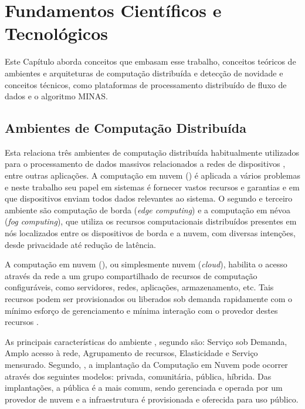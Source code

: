 
\chapter{Fundamentos Científicos e Tecnológicos}\label{cha:fundamentos}

Este Capítulo aborda conceitos que embasam esse trabalho,
conceitos teóricos de
ambientes e arquiteturas de computação distribuída e detecção de novidade
e conceitos técnicos, como plataformas de processamento distribuído de fluxo
de dados e o algoritmo MINAS.

\section{Ambientes de Computação Distribuída}

Esta \Section relaciona três ambientes de computação distribuída habitualmente
utilizados para o processamento de dados massivos relacionados a redes de
dispositivos \iot, entre outras aplicações.
A computação em nuvem (\cloud) é
aplicada a vários problemas e neste trabalho seu papel em sistemas \iot é
fornecer vastos recursos e garantias e em que dispositivos
enviam todos dados relevantes ao sistema.
O segundo e terceiro ambiente são computação de borda (\emph{edge computing})
e a computação em névoa (\emph{fog computing}), que utiliza os recursos
computacionais distribuídos presentes em nós localizados entre os dispositivos
de borda e a nuvem, com diversas 
intenções, desde privacidade até redução de latência.


A computação em nuvem (\cloud), ou simplesmente nuvem
(\emph{cloud}), habilita o acesso através da rede a um grupo compartilhado de
recursos de computação configuráveis, como servidores, redes, aplicações,
armazenamento, etc.
Tais recursos podem ser provisionados ou liberados sob
demanda rapidamente com o mínimo esforço de gerenciamento
e mínima interação com o provedor destes recursos \cite{NIST2011}.

As principais características do ambiente \cloud, segundo 
são: Serviço sob Demanda, Amplo acesso à rede, Agrupamento de recursos,
Elasticidade e Serviço mensurado.
Segundo, , a implantação da Computação em Nuvem pode
ocorrer através dos seguintes modelos: privada, comunitária, pública, híbrida.
Das implantações, a pública é a mais comum, sendo gerenciada e operada por um
provedor de nuvem e a infraestrutura é provisionada e oferecida para uso
público.

